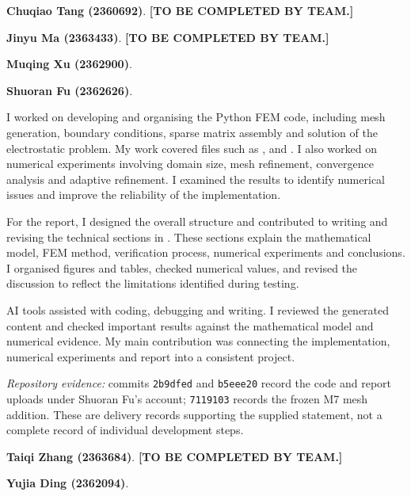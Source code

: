 \documentclass[11pt]{article}
\newcommand{\todo}[1]{\textcolor{red!70!black}{\textbf{[#1]}}}
\begin{document}
\begin{description}[style=nextline,leftmargin=0pt,labelwidth=0pt]
\item[Member 1:] \textbf{Chuqiao Tang (2360692)}. \todo{TO BE COMPLETED BY TEAM.}
\item[Member 2:] \textbf{Jinyu Ma (2363433)}. \todo{TO BE COMPLETED BY TEAM.}
\item[Member 3:] \textbf{Muqing Xu (2362900)}.

\item[Member 4:] \textbf{Shuoran Fu (2362626)}.

I worked on developing and organising the Python FEM code, including mesh generation, boundary conditions, sparse matrix assembly and solution of the electrostatic problem. My work covered files such as ,  and . I also worked on numerical experiments involving domain size, mesh refinement, convergence analysis and adaptive refinement. I examined the results to identify numerical issues and improve the reliability of the implementation.

For the report, I designed the overall structure and contributed to writing and revising the technical sections in . These sections explain the mathematical model, FEM method, verification process, numerical experiments and conclusions. I organised figures and tables, checked numerical values, and revised the discussion to reflect the limitations identified during testing.

AI tools assisted with coding, debugging and writing. I reviewed the generated content and checked important results against the mathematical model and numerical evidence. My main contribution was connecting the implementation, numerical experiments and report into a consistent project.

\noindent\textit{Repository evidence:} commits \texttt{2b9dfed} and \texttt{b5eee20} record the code and report uploads under Shuoran Fu's account; \texttt{7119103} records the frozen M7 mesh addition. These are delivery records supporting the supplied statement, not a complete record of individual development steps.

\item[Member 5:] \textbf{Taiqi Zhang (2363684)}. \todo{TO BE COMPLETED BY TEAM.}
\item[Member 6:] \textbf{Yujia Ding (2362094)}.
\end{description}
\end{document}
